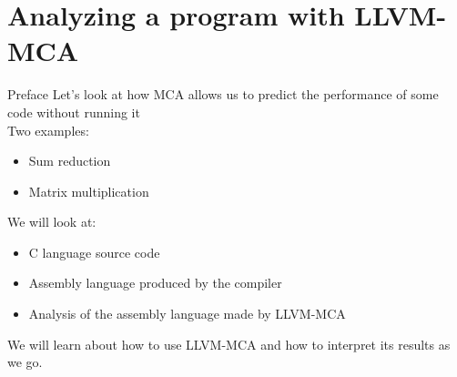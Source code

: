 
\section{Analyzing a program with LLVM-MCA}


\begin{frame}{Preface}
Let's look at how MCA allows us to predict the performance of some code \alert{without running it}\\
\medskip
Two examples:
\begin{itemize}
\item Sum reduction
\item Matrix multiplication
\end{itemize}
\medskip
We will look at:
\begin{itemize}
\item C language source code
\item Assembly language produced by the compiler
\item Analysis of the assembly language made by LLVM-MCA
\end{itemize}
We will learn about how to use LLVM-MCA and how to interpret its results as we go.
\end{frame}










